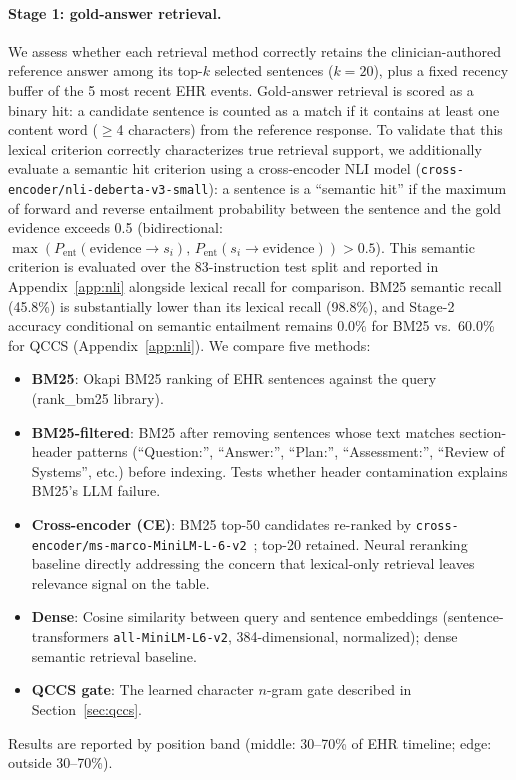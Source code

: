 \documentclass{article}
\begin{document}
\paragraph{Stage 1: gold-answer retrieval.} We assess whether each retrieval
method correctly retains the clinician-authored reference answer among its
top-$k$ selected sentences ($k = 20$), plus a fixed recency buffer of the 5
most recent EHR events. Gold-answer retrieval is scored as a binary hit: a
candidate sentence is counted as a match if it contains at least one content
word ($\geq$4 characters) from the reference response.
To validate that this lexical criterion correctly characterizes true retrieval
support, we additionally evaluate a semantic hit criterion using a cross-encoder
NLI model (\texttt{cross-encoder/nli-deberta-v3-small}): a sentence is a
``semantic hit'' if the maximum of forward and reverse entailment probability
between the sentence and the gold evidence exceeds 0.5
(bidirectional: $\max(P_{\mathrm{ent}}(\text{evidence}\to s_i),\, P_{\mathrm{ent}}(s_i\to\text{evidence})) > 0.5$).
This semantic criterion is evaluated over the 83-instruction test split and
reported in Appendix~\ref{app:nli} alongside lexical recall for comparison.
BM25 semantic recall (45.8\%) is substantially lower than its lexical recall (98.8\%),
and Stage-2 accuracy conditional on semantic entailment remains 0.0\% for BM25
vs.\ 60.0\% for QCCS (Appendix~\ref{app:nli}). We compare five methods:
\begin{itemize}[leftmargin=*, topsep=1pt, itemsep=0pt]
  \item \textbf{BM25}: Okapi BM25 ranking of EHR sentences against the query
    (rank\_bm25 library).
  \item \textbf{BM25-filtered}: BM25 after removing sentences whose text
    matches section-header patterns (``Question:'', ``Answer:'', ``Plan:'',
    ``Assessment:'', ``Review of Systems'', etc.) before indexing. Tests whether
    header contamination explains BM25's LLM failure.
  \item \textbf{Cross-encoder (CE)}: BM25 top-50 candidates re-ranked by
    \texttt{cross-encoder/ms-marco-MiniLM-L-6-v2}~\cite{reimers2019sentence};
    top-20 retained. Neural reranking baseline directly addressing the concern
    that lexical-only retrieval leaves relevance signal on the table.
  \item \textbf{Dense}: Cosine similarity between query and sentence embeddings
    (sentence-transformers \texttt{all-MiniLM-L6-v2}, 384-dimensional, normalized);
    dense semantic retrieval baseline.
  \item \textbf{QCCS gate}: The learned character $n$-gram gate described in
    Section~\ref{sec:qccs}.
\end{itemize}
Results are reported by position band (middle: 30--70\% of EHR timeline; edge:
outside 30--70\%).
\end{document}
